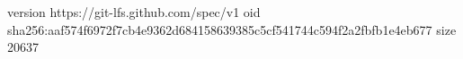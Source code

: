 version https://git-lfs.github.com/spec/v1
oid sha256:aaf574f6972f7cb4e9362d684158639385c5cf541744c594f2a2fbfb1e4eb677
size 20637
